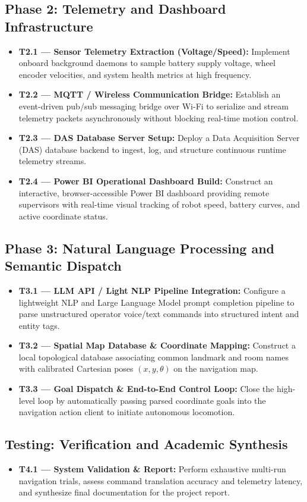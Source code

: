 \subsection*{Phase 2: Telemetry and Dashboard Infrastructure}
\begin{itemize}
    \item \textbf{T2.1 --- Sensor Telemetry Extraction (Voltage/Speed):} Implement onboard background daemons to sample battery supply voltage, wheel encoder velocities, and system health metrics at high frequency.
    \item \textbf{T2.2 --- MQTT / Wireless Communication Bridge:} Establish an event-driven pub/sub messaging bridge over Wi-Fi to serialize and stream telemetry packets asynchronously without blocking real-time motion control.
    \item \textbf{T2.3 --- DAS Database Server Setup:} Deploy a Data Acquisition Server (DAS) database backend to ingest, log, and structure continuous runtime telemetry streams.
    \item \textbf{T2.4 --- Power BI Operational Dashboard Build:} Construct an interactive, browser-accessible Power BI dashboard providing remote supervisors with real-time visual tracking of robot speed, battery curves, and active coordinate status.
\end{itemize}

\subsection*{Phase 3: Natural Language Processing and Semantic Dispatch}
\begin{itemize}
    \item \textbf{T3.1 --- LLM API / Light NLP Pipeline Integration:} Configure a lightweight NLP and Large Language Model prompt completion pipeline to parse unstructured operator voice/text commands into structured intent and entity tags.
    \item \textbf{T3.2 --- Spatial Map Database \& Coordinate Mapping:} Construct a local topological database associating common landmark and room names with calibrated Cartesian poses $(x, y, \theta)$ on the navigation map.
    \item \textbf{T3.3 --- Goal Dispatch \& End-to-End Control Loop:} Close the high-level loop by automatically passing parsed coordinate goals into the navigation action client to initiate autonomous locomotion.
\end{itemize}

\subsection*{Testing: Verification and Academic Synthesis}
\begin{itemize}
    \item \textbf{T4.1 --- System Validation \& Report:} Perform exhaustive multi-run navigation trials, assess command translation accuracy and telemetry latency, and synthesize final documentation for the project report.
\end{itemize}

